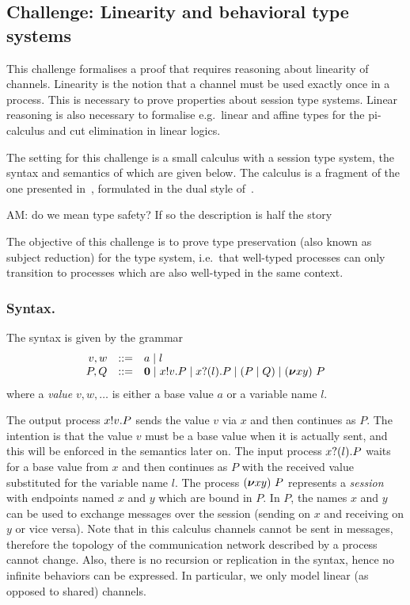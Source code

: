 \subsection{Challenge: Linearity and behavioral type systems}
\label{sec:challenge:linearity-beh-types}
This challenge formalises a proof that requires reasoning about linearity of channels.
Linearity is the notion that a channel must be used exactly once in a process.
This is necessary to prove properties about session type systems.
Linear reasoning is also necessary to formalise e.g.\ linear and affine types for the pi-calculus and cut elimination in linear logics.

The setting for this challenge is a small calculus with a session type
system, the syntax and semantics of which are given below. The
calculus is a fragment of the one presented in~\cite{Vasconcelos2012},
formulated in the dual style of~\cite{barber96tr}.

\begin{metanote}
 AM: do we mean type safety? If so the description is half the story
\end{metanote}
The objective of this challenge is to prove type preservation (also
known as subject reduction) for the type system, i.e.\ that well-typed
processes can only transition to processes which are also well-typed
in the same context.

\subsubsection{Syntax.}
The syntax is given by the grammar
\[
\begin{array}{rcl}
  v,w & ::= & a \mid l \\
   P,Q & ::=& \bm{0} \mid x ! v . P \mid x ? (l) . P \mid (P \mid Q) \mid  (\bm{\nu} xy)~P
\end{array}
\]
where a \emph{value} \( v, w, \dots \) is either a base value \( a \) or a variable name \( l \).

The output process \( x ! v . P \) sends the value \( v \) via \( x \) and then continues as \( P \).
The intention is that the value \( v \) must be a base value when it is actually sent, and this will be enforced in the semantics later on.
The input process \( x ? (l) . P \) waits for a base value from \( x \) and then continues as \( P \) with the received value substituted for the variable name \( l \).
%
The process \( (\bm{\nu} xy)~P \) represents a \emph{session} with endpoints named \( x \) and \( y \) which are bound in \( P \). In \( P \), the names \( x \) and \( y \) can be used to exchange messages over the session (sending on \( x \) and receiving on \( y \) or vice versa).
%
%
Note that in this calculus channels cannot be sent in messages, therefore the topology of the communication network described by a process cannot change.
Also, there is no recursion or replication in the syntax, hence no infinite behaviors can be expressed. In particular, we only model linear (as opposed to shared) channels.


